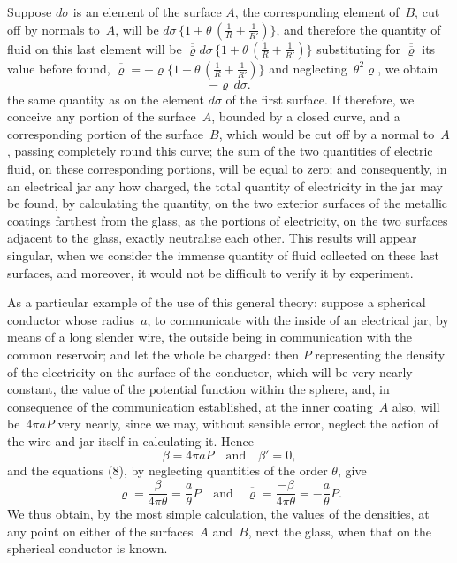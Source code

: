 \documentclass[11pt,notitlepage]{amsart}
\renewcommand{\rho}{\varrho}
\begin{document}
Suppose $d\sigma$ is an element of the surface $A$, the corresponding element
of~$B$, cut off by normals to~$A$, will be
$d\sigma\,\{1+\theta\,(\frac1R+\frac{1}{R'})\}$, and therefore
the quantity of fluid on this last element will be
$\overline{\overline\rho}d\sigma\,\{1+\theta\,(\frac1R+\frac{1}{R'})\}$
substituting for $\overline{\overline\rho}$ its value before found,
$\overline{\overline\rho}=
-\overline\rho\{1-\theta\,(\frac1R+\frac{1}{R'})\}$
and neglecting~$\theta^2\overline\rho$, we obtain
\[
-\overline\rho\,d\sigma.
\]
the same quantity as on the element $d\sigma$
of the first surface. If therefore, we
conceive any portion of the surface~$A$, bounded by a closed curve, and a
corresponding portion of the surface~$B$, which would be cut off by a normal
to~$A$, passing completely round this curve; the sum of the two quantities of
electric fluid, on these corresponding portions, will be equal to zero; and
consequently, in an electrical jar any how charged, the total quantity of
electricity in the jar may be found, by calculating the quantity, on the two
exterior surfaces of the metallic coatings farthest from the glass, as the 
portions of electricity,
on the two surfaces adjacent to the glass, exactly neutralise
each other. This results will appear singular, when we consider the immense
quantity of fluid collected on these last surfaces, and moreover, it would not
be difficult to verify it by experiment.

As a particular example of the use of this general theory: suppose
a spherical conductor whose radius~$a$, to communicate with the inside of an
electrical jar, by means of a long slender wire, the outside being in 
communication with the common reservoir; and let the whole be charged: then $P$
representing the density of the electricity on the surface of the conductor,
which will be very nearly constant, the value of the potential function within
the sphere, and, in consequence of the communication established, at the inner
coating~$A$ also, will be~$4\pi aP$ very nearly, since we may, without sensible
error, neglect the action of the wire and jar itself in calculating it. Hence
\[
\beta=4\pi aP \quad\text{and}\quad \beta'=0,
\]
and the equations (8), by neglecting quantities of the order $\theta$, give
\[
\overline\rho=\frac{\beta}{4\pi\theta}=\frac{a}{\theta}P
\quad\text{and}\quad
\overline{\overline\rho}=\frac{-\beta}{4\pi\theta}=-\frac{a}{\theta}P.
\]
We thus obtain, by the most simple calculation, the values of the densities,
at any point on either of the surfaces~$A$ and~$B$,
next the glass, when that
on the spherical conductor is known.
\end{document}

